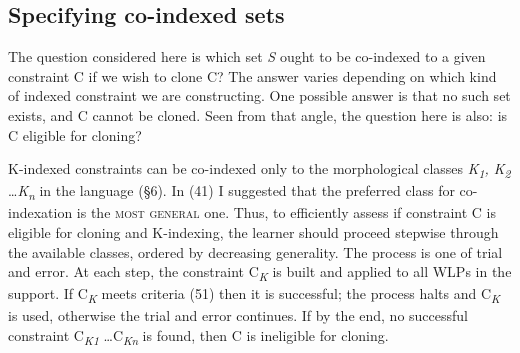 \documentclass[output=paper,
modfonts
]{LSP/langsci}
\begin{document}
\subsection[Specifying co{}-indexed sets]{Specifying co-indexed sets}
\label{bkm:Ref335906264}\label{bkm:Ref335576418}
The question considered here is which set \textit{S} ought to be co-indexed to a given constraint C if we wish to clone C? The answer varies depending on which kind of indexed constraint we are constructing. One possible answer is that no such set exists, and C cannot be cloned. Seen from that angle, the question here is also: is C eligible for cloning?

K-indexed constraints can be co-indexed only to the morphological classes \textit{K}\textit{\textsubscript{1}}\textit{, K}\textit{\textsubscript{2}} \dots \textit{K}\textit{\textsubscript{n}} in the language (§6). In (41) I suggested that the preferred class for co-indexation is the \textsc{most} \textsc{general} one. Thus, to efficiently assess if constraint C is eligible for cloning and K-indexing, the learner should proceed stepwise through the available classes, ordered by decreasing generality. The process is one of trial and error. At each step, the constraint C\textit{\textsubscript{K}} is built and applied to all WLPs in the support. If C\textit{\textsubscript{K}} meets criteria (51) then it is successful; the process halts and C\textit{\textsubscript{K}} is used, otherwise the trial and error continues. If by the end, no successful constraint C\textit{\textsubscript{K1}} \dots C\textit{\textsubscript{Kn} }is found, then C is ineligible for cloning.
\end{document}
